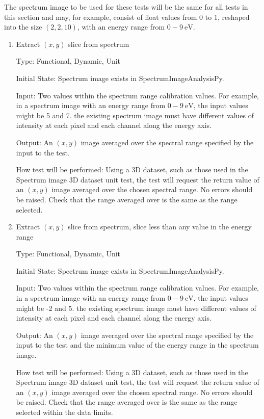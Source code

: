 \documentclass[12pt, titlepage]{article}
\newcommand{\progname}{SpectrumImageAnalysisPy}
\begin{document}
The spectrum image to be used for these tests will be the same for all tests in
this section and may, for example, consist of float values from 0 to 1, reshaped
into the size $(2,2,10)$, with an energy range from $0-9\ \si{\electronvolt}$.

\begin{enumerate}

\item{Extract $(x,y)$ slice from spectrum}

Type: Functional, Dynamic, Unit

Initial State: Spectrum image exists in \progname{}.

Input: Two values within the spectrum range calibration values. For example, in
a spectrum image with an energy range from $0-9\ \si{\electronvolt}$, the input
values might be 5 and 7. the existing spectrum image must have different values
of intensity at each pixel and each channel along the energy axis.

Output: An $(x,y)$ image averaged over the spectral range specified by the input
to the test.

How test will be performed: Using a 3D dataset, such as those used in the
Spectrum image 3D dataset unit test, the test will request the return value of
an $(x,y)$ image averaged over the chosen spectral range. No errors should be
raised. Check that the range averaged over is the same as the range selected.


\item{Extract $(x,y)$ slice from spectrum, slice less than any value in the
energy range}

Type: Functional, Dynamic, Unit

Initial State: Spectrum image exists in \progname{}.

Input: Two values within the spectrum range calibration values. For example, in
a spectrum image with an energy range from $0-9\ \si{\electronvolt}$, the input
values might be -2 and 5. the existing spectrum image must have different values
of intensity at each pixel and each channel along the energy axis.

Output: An $(x,y)$ image averaged over the spectral range specified by the input
to the test and the minimum value of the energy range in the spectrum image.

How test will be performed: Using a 3D dataset, such as those used in the
Spectrum image 3D dataset unit test, the test will request the return value of
an $(x,y)$ image averaged over the chosen spectral range. No errors should be
raised. Check that the range averaged over is the same as the range selected
within the data limits.



\end{enumerate}
\end{document}
